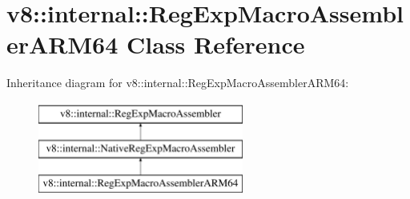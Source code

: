 \hypertarget{classv8_1_1internal_1_1RegExpMacroAssemblerARM64}{}\section{v8\+:\+:internal\+:\+:Reg\+Exp\+Macro\+Assembler\+A\+R\+M64 Class Reference}
\label{classv8_1_1internal_1_1RegExpMacroAssemblerARM64}
Inheritance diagram for v8\+:\+:internal\+:\+:Reg\+Exp\+Macro\+Assembler\+A\+R\+M64\+:\begin{figure}[H]
\begin{center}
\leavevmode
\includegraphics[height=3.000000cm]{classv8_1_1internal_1_1RegExpMacroAssemblerARM64}
\end{center}
\end{figure}
